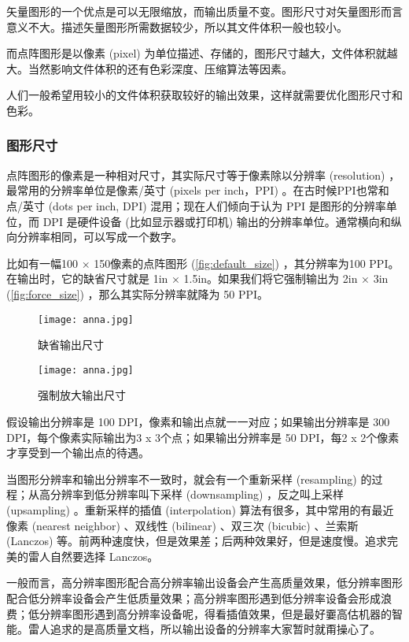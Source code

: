 矢量图形的一个优点是可以无限缩放，而输出质量不变。图形尺寸对矢量图形而言意义不大。描述矢量图形所需数据较少，所以其文件体积一般也较小。

而点阵图形是以像素 (pixel) 为单位描述、存储的，图形尺寸越大，文件体积就越大。当然影响文件体积的还有色彩深度、压缩算法等因素。

人们一般希望用较小的文件体积获取较好的输出效果，这样就需要优化图形尺寸和色彩。

\subsubsection{图形尺寸}

点阵图形的像素是一种相对尺寸，其实际尺寸等于像素除以分辨率 (resolution) ，最常用的分辨率单位是像素/英寸 (pixels per inch，PPI) 。在古时候PPI也常和点/英寸 (dots per inch, DPI) 混用；现在人们倾向于认为 PPI 是图形的分辨率单位，而 DPI 是硬件设备 (比如显示器或打印机) 输出的分辨率单位。通常横向和纵向分辨率相同，可以写成一个数字。

比如有一幅100 × 150像素的点阵图形 (\autoref{fig:default_size}) ，其分辨率为100 PPI。在输出时，它的缺省尺寸就是 1in × 1.5in。如果我们将它强制输出为 2in × 3in (\autoref{fig:force_size}) ，那么其实际分辨率就降为 50 PPI。

\begin{figure}[htbp]
\centering
\begin{minipage}[b]{1.4in}
\centering
\texttt{[image: anna.jpg]}
\caption{缺省输出尺寸}
\label{fig:default_size}
\end{minipage}
\hspace{10pt}
\begin{minipage}[b]{2in}
\centering
\texttt{[image: anna.jpg]}
\caption{强制放大输出尺寸}
\label{fig:force_size}
\end{minipage}
\end{figure}

假设输出分辨率是 100 DPI，像素和输出点就一一对应；如果输出分辨率是 300 DPI，每个像素实际输出为3 x 3个点；如果输出分辨率是 50 DPI，每2 x 2个像素才享受到一个输出点的待遇。

当图形分辨率和输出分辨率不一致时，就会有一个重新采样 (resampling) 的过程；从高分辨率到低分辨率叫下采样 (downsampling) ，反之叫上采样 (upsampling) 。重新采样的插值 (interpolation) 算法有很多，其中常用的有最近像素 (nearest neighbor) 、双线性 (bilinear) 、双三次 (bicubic) 、兰索斯 (Lanczos) 等。前两种速度快，但是效果差；后两种效果好，但是速度慢。追求完美的雷人自然要选择 Lanczos。

一般而言，高分辨率图形配合高分辨率输出设备会产生高质量效果，低分辨率图形配合低分辨率设备会产生低质量效果；高分辨率图形遇到低分辨率设备会形成浪费；低分辨率图形遇到高分辨率设备呢，得看插值效果，但是最好嫑高估机器的智能。雷人追求的是高质量文档，所以输出设备的分辨率大家暂时就甭操心了。


